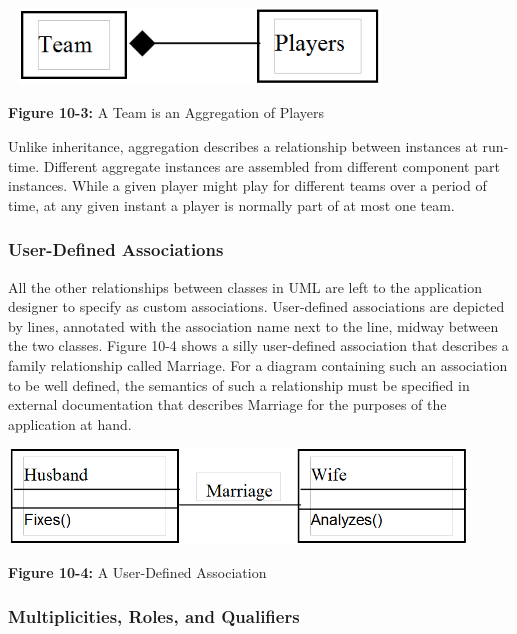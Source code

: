 \bigskip

\includegraphics[width=4.0in,height=0.8in]{ub-img/aggregat.png} 

{\sffamily\bfseries Figure 10-3:}
{\sffamily A Team is an Aggregation of Players}

\bigskip

Unlike inheritance, aggregation describes a relationship between
instances at run-time. Different aggregate instances are assembled from
different component part instances. While a given player might play for
different teams over a period of time, at any given instant a player is
normally part of at most one team.

\subsubsection{User-Defined Associations}

All the other relationships between classes in UML are left
to the application designer to specify as custom associations.
User-defined associations are depicted by lines, annotated with the
association name next to the line, midway between the two classes.
Figure 10-4 shows a silly user-defined association that describes a
family relationship called Marriage. For a diagram containing such an
association to be well defined, the semantics of such a relationship
must be specified in external documentation that describes Marriage for
the purposes of the application at hand.

\bigskip

\includegraphics[width=4.8in,height=1.0in]{ub-img/marriage.png} 

{\sffamily\bfseries Figure 10-4:}
{\sffamily A User-Defined Association}

\bigskip

\subsubsection{Multiplicities, Roles, and Qualifiers}

